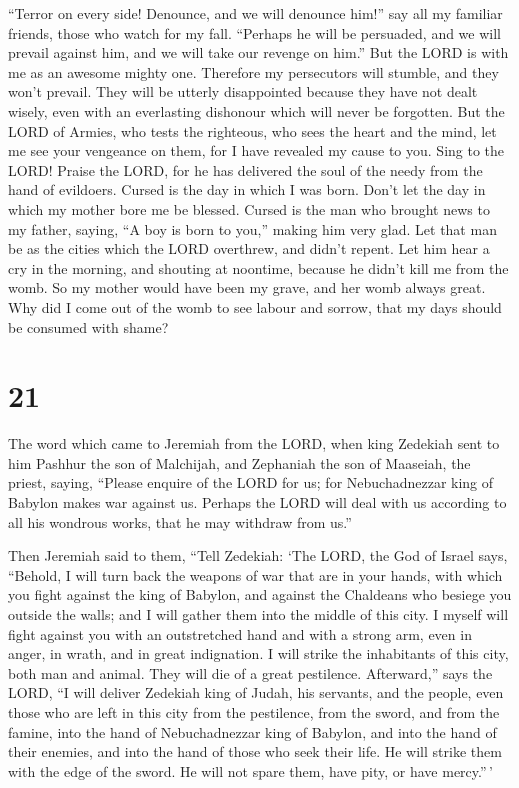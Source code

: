 ``Terror on every side! Denounce, and we will denounce him!'' say all my
familiar friends, those who watch for my fall. ``Perhaps he will be
persuaded, and we will prevail against him, and we will take our revenge
on him.''  But the LORD is with me as an awesome mighty
one. Therefore my persecutors will stumble, and they won't prevail. They
will be utterly disappointed because they have not dealt wisely, even
with an everlasting dishonour which will never be forgotten.
 But the LORD of Armies, who tests the righteous, who
sees the heart and the mind, let me see your vengeance on them, for I
have revealed my cause to you.  Sing to the LORD! Praise
the LORD, for he has delivered the soul of the needy from the hand of
evildoers.  Cursed is the day in which I was born. Don't
let the day in which my mother bore me be blessed. 
Cursed is the man who brought news to my father, saying, ``A boy is born
to you,'' making him very glad.  Let that man be as the
cities which the LORD overthrew, and didn't repent. Let him hear a cry
in the morning, and shouting at noontime,  because he
didn't kill me from the womb. So my mother would have been my grave, and
her womb always great.  Why did I come out of the womb to
see labour and sorrow, that my days should be consumed with shame?

\hypertarget{section-20}{%
\section{21}\label{section-20}}

 The word which came to Jeremiah from the LORD, when king
Zedekiah sent to him Pashhur the son of Malchijah, and Zephaniah the son
of Maaseiah, the priest, saying,  ``Please enquire of the
LORD for us; for Nebuchadnezzar king of Babylon makes war against us.
Perhaps the LORD will deal with us according to all his wondrous works,
that he may withdraw from us.''

 Then Jeremiah said to them, ``Tell Zedekiah:
 `The LORD, the God of Israel says, ``Behold, I will turn
back the weapons of war that are in your hands, with which you fight
against the king of Babylon, and against the Chaldeans who besiege you
outside the walls; and I will gather them into the middle of this city.
 I myself will fight against you with an outstretched hand
and with a strong arm, even in anger, in wrath, and in great
indignation.  I will strike the inhabitants of this city,
both man and animal. They will die of a great pestilence. 
Afterward,'' says the LORD, ``I will deliver Zedekiah king of Judah, his
servants, and the people, even those who are left in this city from the
pestilence, from the sword, and from the famine, into the hand of
Nebuchadnezzar king of Babylon, and into the hand of their enemies, and
into the hand of those who seek their life. He will strike them with the
edge of the sword. He will not spare them, have pity, or have
mercy.''\,'

